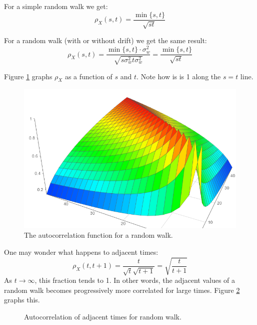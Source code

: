 \documentclass[12pt, a4paper]{article}
\numberwithin{equation}{section}
\begin{document}
For a simple random walk we get:
\begin{equation}
\rho_X(s,t)=\frac{\min\{s,t\}}{\sqrt{st}}
\end{equation}

For a random walk (with or without drift) we get the same result:
\begin{equation}
\rho_X(s,t)=\frac{\min\{s,t\}\cdot\sigma_w^2}{\sqrt{s\sigma_w^2 t\sigma_w^2}}=\frac{\min\{s,t\}}{\sqrt{st}}
\end{equation}

Figure \ref{fig:re_autocorr} graphs $\rho_X$ as a function of $s$ and $t$. Note how is is 1 along the $s=t$ line.

\begin{figure}
\centering
\includegraphics[width=\textwidth]{rw_autocorr}
\caption{The autocorrelation function for a random walk.}
\label{fig:re_autocorr}
\end{figure}

One may wonder what happens to adjacent times:
\begin{equation}
\rho_X(t,t+1)=\frac{t}{\sqrt{t}\sqrt{t+1}}=\sqrt{\frac{t}{t+1}}
\end{equation}
As $t\rightarrow\infty$, this fraction tends to 1. In other words, the adjacent values of a random walk becomes progressively more correlated for large times. Figure \ref{fig:adjacent_times_autocorrelation} graphs this.

\begin{figure}
\centering
{}
\caption{Autocorrelation of adjacent times for random walk.}
\label{fig:adjacent_times_autocorrelation}
\end{figure}
\end{document}
